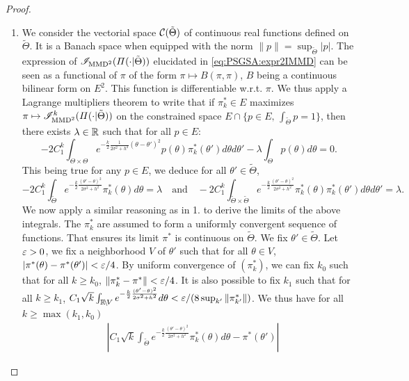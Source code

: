 \begin{proof}
\begin{enumerate}
\item We consider the vectorial space $\mathcal{C}(\tilde\Theta)$ of continuous real functions defined on $\tilde\Theta$. It is a Banach space when equipped with the norm $\|p\|=\sup_{\tilde\Theta}|p|$. The expression of $\mathscr{I}_{\text{MMD}^2}(\varPi(\cdot|\tilde\Theta))$ elucidated in \cref{eq:PSGSA:expr2IMMD} can be seen as a functional of $\pi$ of the form $\pi\mapsto B(\pi,\pi)$, $B$ being a continuous bilinear form on $E^2$. This function is differentiable w.r.t. $\pi$. We thus  apply a Lagrange multipliers theorem to write that if $\pi_k^\ast\in E$ maximizes $\pi\mapsto\mathscr{I}^k_{\text{MMD}^2}(\varPi(\cdot|\tilde\Theta))$ on the constrained space $E\cap\{p\in E,\,\int_{\tilde\Theta}p=1\}$, then there exists $\lambda\in\mathbb{R}$ such that for all $p\in E$:
\begin{equation}
    -2C_1^k\int_{\Theta\times\Theta} e^{-\frac{k}{2}\frac{1}{2\sigma^2+h^2}(\theta-\theta')^2} p(\theta)\pi^\ast_k(\theta')d\theta d\theta' - \lambda\int_\Theta p(\theta)d\theta = 0.
\end{equation}
This being true for any $p\in E$, we deduce for all $\theta'\in\tilde\Theta$, %
    \begin{equation}
        -2C_1^k\int_{\tilde\Theta} e^{-\frac{k}{2}\frac{(\theta'-\theta)^2}{2\sigma^2+h^2}} \pi_k^\ast(\theta)d\theta = \lambda \quad\text{and}\quad
        -2C_1^k\int_{\tilde\Theta\times\tilde\Theta} e^{-\frac{k}{2}\frac{(\theta'-\theta)^2}{2\sigma^2+h^2}} \pi_k^\ast(\theta)\pi_k^\ast(\theta')d\theta d\theta' = \lambda.
    \end{equation}
We now apply a similar reasoning as in 1. to derive the limits of the above integrals. 
The $\pi^\ast_k$ are assumed to form a uniformly convergent sequence of functions. That ensures its limit $\pi^\ast$ is continuous on $\tilde\Theta$.
We fix $\theta'\in\tilde\Theta$. Let $\varepsilon>0$, we fix a neighborhood $V$ of $\theta'$ such that for all $\theta \in V$, $|\pi^\ast(\theta)-\pi^\ast(\theta')|<\varepsilon/4$. By uniform convergence of $(\pi^\ast_k)$, we can fix $k_0$ such that for all $k\geq k_0$, $\|\pi^\ast_k-\pi^\ast\|<\varepsilon/4$. It is also possible to fix $k_1$ such that for all $k\geq k_1$, $C_1\sqrt{k}\int_{\mathbb{R}\!\setminus\!V} e^{-\frac{k}{2}\frac{(\theta'-\theta)^2}{2\sigma^2+h^2}}d\theta <\varepsilon/(8\sup_{k'}\|\pi^\ast_{k'}\|)$.
    We thus have for all $k\geq\max(k_1,k_0)$
    \begin{equation}
        \begin{aligned}
        &\left|C_1\sqrt{k}\int_{\tilde\Theta } e^{-\frac{k}{2}\frac{(\theta'-\theta)^2}{2\sigma^2+h^2}} \pi^\ast_k(\theta)d\theta - \pi^\ast(\theta') \right| 

\end{aligned}
\end{equation}
\end{enumerate}
\end{proof}
